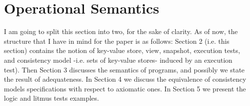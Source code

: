 \section{Operational Semantics}
\label{sec:model}
\label{sec:semantics}

\ac{I am going to split this section into two, for the sake of clarity. 
As of now, the structure that I have in mind for the paper is as follows: 
Section 2 (i.e. this section) contains the notion of key-value store, view, snapshot, 
execution tests, and consistency model  -i.e. sets of key-value stores- 
induced by an execution test). Then Section 3 discusses 
the semantics of programs, and possibly we state the result 
of adequateness. In Section 4 we discuss the equivalence of consistency 
models specifications with respect to axiomatic ones. In Section 5 
we present the logic and litmus tests examples.}





